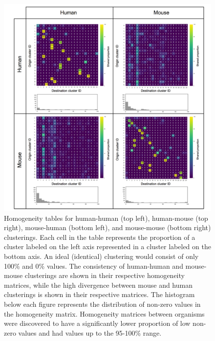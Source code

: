\documentclass[12pt,oneside,onecolumn,a4paper]{article}
\begin{document}
\begin{figure}[H]
\begin{center}
\includegraphics[width=\columnwidth]{figures/homogeneity_min}
\caption{Homogeneity tables for human-human (top left), human-mouse (top right), mouse-human (bottom left), and mouse-mouse (bottom right) clusterings. Each cell in the table represents the proportion of a cluster labeled on the left axis represented in a cluster labeled on the bottom axis. An ideal (identical) clustering would consist of only 100\% and 0\% values. The consistency of human-human and mouse-mouse clusterings are shown in their respective homogeneity matrices, while the high divergence between mouse and human clusterings is shown in their respective matrices. The histogram below each figure represents the distribution of non-zero values in the homogeneity matrix. Homogeneity matrices between organisms were discovered to have a significantly lower proportion of low non-zero values and had values up to the 95-100\% range.\label{fig:homogeneity_table}%
}

\end{center}
\end{figure}
\end{document}
